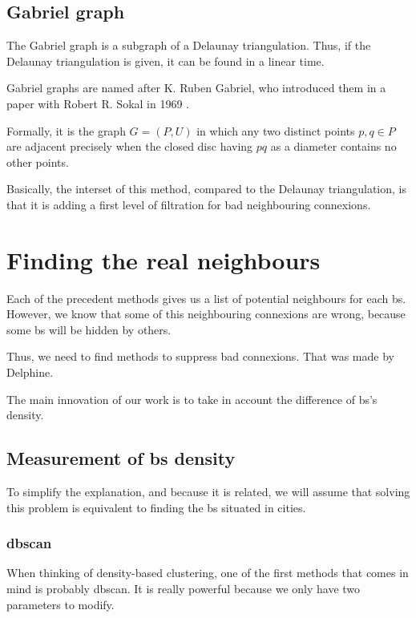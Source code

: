 \documentclass[lettersize,journal,english]{IEEEtran}
\begin{document}
\subsection{Gabriel graph}
\noindent The Gabriel graph is a subgraph of a Delaunay triangulation. Thus, if the Delaunay triangulation is given, it can be found in a linear time. 

Gabriel graphs are named after K. Ruben Gabriel, who introduced them in a paper with Robert R. Sokal in 1969 \cite{art_gabriel}.

Formally, it is the graph $G = (P, U)$ in which any two distinct points $p, q \in P$ are adjacent precisely when the closed disc having $pq$ as a diameter contains no other points.

Basically, the interset of this method, compared to the Delaunay triangulation, is that it is adding a first level of filtration for bad neighbouring connexions.

\section{Finding the real neighbours}

\noindent Each of the precedent methods gives us a list of potential neighbours for each \acrshort{bs}. However, we know that some of this neighbouring connexions are wrong,
because some \acrshort{bs} will be \og hidden\fg{} by others.

Thus, we need to find methods to suppress bad connexions. That was made by Delphine.

The main innovation of our work is to take in account the difference of \acrshort{bs}'s density.

\subsection{Measurement of \acrshort{bs} density}
\noindent To simplify the explanation, and because it is related, we will assume that solving this problem is equivalent to finding the \acrshort{bs} situated in \og cities\fg{}.

\subsubsection{\acrshort{dbscan}}
When thinking of density-based clustering, one of the first methods that comes in mind is probably \acrshort{dbscan}.
It is really powerful because we only have two parameters to modify.
\end{document}
